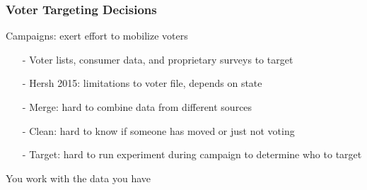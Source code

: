 \documentclass{beamer}
\numberwithin{equation}{section}
\begin{document}
\begin{frame}
\frametitle{Voter Targeting Decisions}

Campaigns: exert effort to mobilize voters
\begin{itemize}
\item[-] Voter lists, consumer data, and proprietary surveys to target
\item[-] Hersh 2015: limitations to voter file, depends on state
\item[-] \alert{Merge}: hard to combine data from different sources
\item[-] \alert{Clean}: hard to know if someone has moved or just not voting
\item[-] \alert{Target}: hard to run experiment during campaign to determine who to target
\end{itemize}  

You work with the data you have 





\end{frame}











\end{document}
